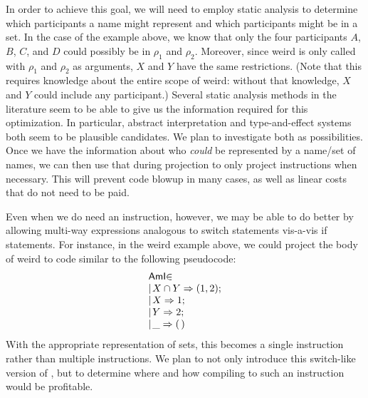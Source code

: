 In order to achieve this goal, we will need to employ static analysis to determine which participants a name might represent and which participants might be in a set.
In the case of the example above, we know that only the four participants $A$, $B$, $C$, and $D$ could possibly be in $\rho_1$ and $\rho_2$.
Moreover, since \textsf{weird} is only called with $\rho_1$ and $\rho_2$ as arguments, $X$ and $Y$ have the same restrictions.
(Note that this requires knowledge about the entire scope of \textsf{weird}: without that knowledge, $X$ and $Y$ could include any participant.)
Several static analysis methods in the literature seem to be able to give us the information required for this optimization.
In particular, abstract interpretation and type-and-effect systems both seem to be plausible candidates.
We plan to investigate both as possibilities.
Once we have the information about who \emph{could} be represented by a name/set of names, we can then use that during projection to only project \AmIName{} instructions when necessary.
This will prevent code blowup in many cases, as well as linear costs that do not need to be paid.

Even when we do need an \AmIName{} instruction, however, we may be able to do better by allowing multi-way \AmIName{} expressions analogous to \textsf{switch} statements vis-a-vis \textsf{if} statements.
For instance, in the \textsf{weird} example above, we could project the body of weird to code similar to the following pseudocode:
$$
\begin{array}{l}
  \textsf{AmI}\mathord{\in}\\
  |\mkern2muX \cap Y \Rightarrow (1, 2);\\
  |\mkern2muX \Rightarrow 1;\\
  |\mkern2muY \Rightarrow 2;\\
  |\mkern2mu\_ \Rightarrow (\,)
\end{array}
$$
With the appropriate representation of sets, this becomes a single instruction rather than multiple instructions.
We plan to not only introduce this \textsf{switch}-like version of \AmIName{}, but to determine where and how compiling to such an instruction would be profitable.


